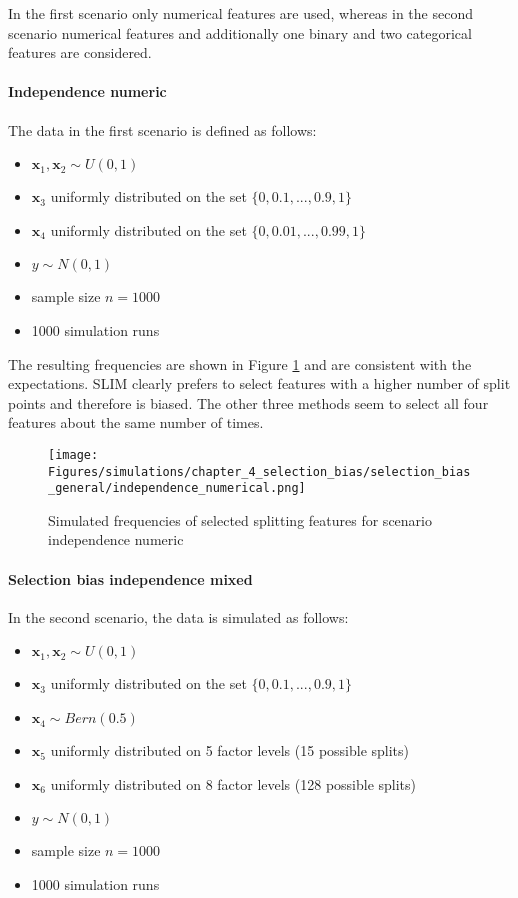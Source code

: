 In the first scenario only numerical features are used, whereas in the second scenario numerical features and additionally one binary and two categorical features are considered.

\paragraph{Independence numeric\\}
The data in the first scenario is defined as follows:
\begin{itemize}
    \item $\textbf{x}_{1}, \textbf{x}_{2} \sim U(0,1)$
    \item $\textbf{x}_3$ uniformly distributed on the set $\{0, 0.1,..., 0.9, 1\}$
    \item $\textbf{x}_4$ uniformly distributed on the set $\{0, 0.01,..., 0.99, 1\}$
    \item $y \sim N(0,1)$
    \item sample size $n = 1000$
    \item 1000 simulation runs
\end{itemize}

The resulting frequencies are shown in Figure \ref{fig:selection_bias_independence_numeric} and are consistent with the expectations. SLIM clearly prefers to select features with a higher number of split points and therefore is biased. The other three methods seem to  select all four features about the same number of times.

\begin{figure}[!htb]
    \centering
    \texttt{[image: Figures/simulations/chapter\_4\_selection\_bias/selection\_bias\_general/independence\_numerical.png]}
    \caption{Simulated frequencies of selected splitting features for scenario independence numeric}
    \label{fig:selection_bias_independence_numeric}
\end{figure}



\paragraph{Selection bias independence mixed \newline} 
In the second scenario, the data is simulated as follows:
\begin{itemize}
    \item $\textbf{x}_{1}, \textbf{x}_{2} \sim U(0,1)$ 
    \item $\textbf{x}_3$ uniformly distributed on the set $\{0, 0.1,..., 0.9, 1\}$ 
    \item $\textbf{x}_4  \sim Bern(0.5)$ 
    \item $\textbf{x}_5$ uniformly distributed on 5 factor levels (15 possible splits) 
    \item $\textbf{x}_6$ uniformly distributed on 8 factor levels (128 possible splits) %
    \item $y \sim N(0,1)$
    \item sample size $n = 1000$
    \item 1000 simulation runs
\end{itemize}


